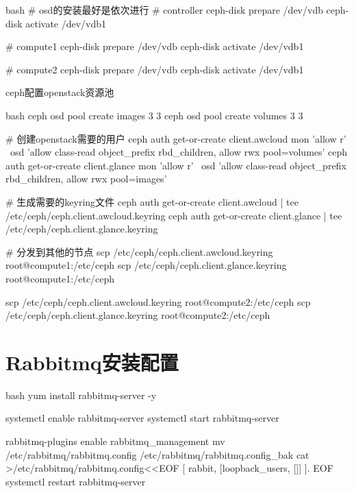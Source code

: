 \begin{outline}[enumerate]
\begin{code-in-enumerate}{bash}
# osd的安装最好是依次进行
# controller
ceph-disk prepare /dev/vdb
ceph-disk activate /dev/vdb1

# compute1
ceph-disk prepare /dev/vdb
ceph-disk activate /dev/vdb1

# compute2
ceph-disk prepare /dev/vdb
ceph-disk activate /dev/vdb1
\end{code-in-enumerate}

\1 ceph配置openstack资源池
\begin{code-in-enumerate}{bash}
ceph osd pool create images 3 3
ceph osd pool create volumes 3 3

# 创建openstack需要的用户
ceph auth get-or-create client.awcloud mon 'allow r' \
    osd 'allow class-read object_prefix rbd_children, allow rwx pool=volumes'
ceph auth get-or-create client.glance mon 'allow r' \
    osd 'allow class-read object_prefix rbd_children, allow rwx pool=images'

# 生成需要的keyring文件
ceph auth get-or-create client.awcloud | tee /etc/ceph/ceph.client.awcloud.keyring
ceph auth get-or-create client.glance | tee /etc/ceph/ceph.client.glance.keyring

# 分发到其他的节点
scp /etc/ceph/ceph.client.awcloud.keyring root@compute1:/etc/ceph
scp /etc/ceph/ceph.client.glance.keyring root@compute1:/etc/ceph

scp /etc/ceph/ceph.client.awcloud.keyring root@compute2:/etc/ceph
scp /etc/ceph/ceph.client.glance.keyring root@compute2:/etc/ceph
\end{code-in-enumerate}

\end{outline}

\section{Rabbitmq安装配置}
\label{section:rabbitmq_configuration}
\begin{code-block}{bash}
yum install rabbitmq-server -y

systemctl enable rabbitmq-server
systemctl start rabbitmq-server

rabbitmq-plugins enable rabbitmq_management
mv /etc/rabbitmq/rabbitmq.config /etc/rabbitmq/rabbitmq.config_bak
cat >/etc/rabbitmq/rabbitmq.config<<EOF
[
{rabbit, [{loopback_users, []}]}
].
EOF
systemctl restart rabbitmq-server
\end{code-block}

